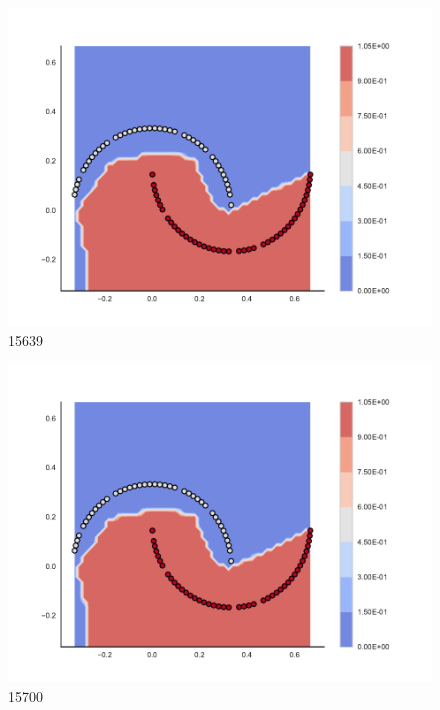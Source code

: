 \begin{subfigure}[b]{0.09\textwidth}
    \includegraphics[clip, trim=2.35cm 1.75cm 4.5cm 0cm,width=\textwidth]{img/convergence/15639.pdf}
    \caption{15639}
    \label{fig:convergence_15639}
\end{subfigure}
%
\begin{subfigure}[b]{0.09\textwidth}
    \includegraphics[clip, trim=2.35cm 1.75cm 4.5cm 0cm,width=\textwidth]{img/convergence/15700.pdf}
    \caption{15700}
    \label{fig:convergence_15700}
\end{subfigure}
%
